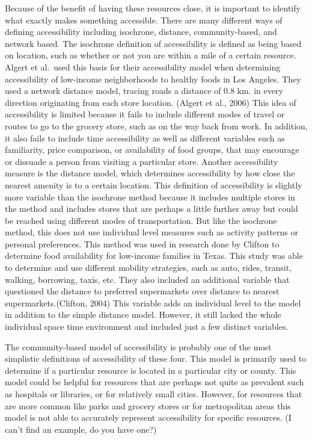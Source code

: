 \documentclass[3p, authoryear]{elsarticle} %
\begin{document}
Because of the benefit of having these resources close, it is important to
identify what exactly makes something accessible. There are many different ways
of defining accessibility including isochrone, distance, community-based, and
network based. The isochrone definition of accessibility is defined as being
based on location, such as whether or not you are within a mile of a certain
resource. Algert et al.~used this basis for their accessibility model when
determining accessibility of low-income neighborhoods to healthy foods in Los
Angeles. They used a network distance model, tracing roads a distance of 0.8 km.
in every direction originating from each store location. (Algert et al., 2006)
This idea of accessibility is limited because it fails to include different
modes of travel or routes to go to the grocery store, such as on the way back
from work. In addition, it also fails to include time accessibility as well as
different variables such as familiarity, price comparison, or availability of
food groups, that may encourage or dissuade a person from visiting a particular
store.
Another accessibility measure is the distance model, which determines
accessibility by how close the nearest amenity is to a certain location. This
definition of accessibility is slightly more variable than the isochrone method
because it includes multiple stores in the method and includes stores that are
perhaps a little further away but could be reached using different modes of
transportation. But like the isochrone method, this does not use individual
level measures such as activity patterns or personal preferences. This method
was used in research done by Clifton to determine food availability for
low-income families in Texas. This study was able to determine and use different
mobility strategies, such as auto, rides, transit, walking, borrowing, taxis,
etc. They also included an additional variable that questioned the distance to
preferred supermarkets over distance to nearest supermarkets.(Clifton, 2004)
This variable adds an individual level to the model in addition to the simple
distance model. However, it still lacked the whole individual space time
environment and included just a few distinct variables.

The community-based model of accessibility is probably one of the most
simplistic definitions of accessibility of these four. This model is primarily
used to determine if a particular resource is located in a particular city or
county. This model could be helpful for resources that are perhaps not quite as
prevalent such as hospitals or libraries, or for relatively small cities.
However, for resources that are more common like parks and grocery stores or for
metropolitan areas this model is not able to accurately represent accessibility
for specific resources. (I can't find an example, do you have one?)
\end{document}
